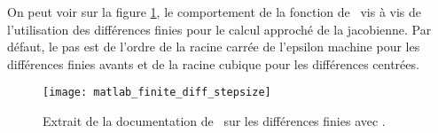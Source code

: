 \begin{myremark}
    \anoter On peut voir sur la figure \ref{fig:extrait_doc_matlab}, le comportement de la fonction  de \matlab\ vis \`a vis de
    l'utilisation des diff\'erences finies pour le calcul approch\'e de la jacobienne. Par d\'efaut, le pas est de l'ordre de la racine carr\'ee
    de l'epsilon machine pour les diff\'erences finies avants et de la racine cubique pour les diff\'erences centr\'ees.
\end{myremark}

\begin{figure}[ht!]
    \begin{center}
        \texttt{[image: matlab\_finite\_diff\_stepsize]}
    \end{center}
    \vspace{-1em}
    \caption{Extrait de la documentation de \matlab\ sur les diff\'erences finies avec .}
    \label{fig:extrait_doc_matlab}
\end{figure}
